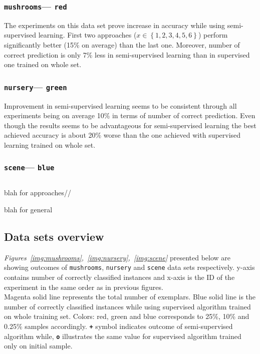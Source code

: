 \documentclass[12pt, a4paper, pdflatex]{report}
\begin{document}
\subsubsection{\texttt{mushrooms}--- \texttt{red}}
The experiments on this data set prove increase in accuracy while using semi-supervised learning. First two approaches ($x \in \left \{ 1, 2, 3 ,4, 5, 6 \right \}$) perform significantly better (15\% on average) than the last one. Moreover, number of correct prediction is only 7\% less in semi-supervised learning than in supervised one trained on whole set.

\subsubsection{\texttt{nursery}--- \texttt{green}}
Improvement in semi-supervised learning seems to be consistent through all experiments being on average 10\% in terms of number of correct prediction. Even though the results seems to be advantageous for semi-supervised learning the best achieved accuracy is about 20\% worse than the one achieved with supervised learning trained on whole set.

\subsubsection{\texttt{scene}--- \texttt{blue}}


\subsection*{}
blah for approaches//

blah for general



\subsection{Data sets overview}
\emph{Figures~\ref{img:mushrooms},~\ref{img:nursery},~\ref{img:scene}} presented below are showing outcomes of \texttt{mushrooms}, \texttt{nursery} and \texttt{scene} data sets respectively. y-axis contains number of correctly classified instances and x-axis is the ID of the experiment in the same order as in previous figures.\\
Magenta solid line represents the total number of exemplars. Blue solid line is the number of correctly classified instances while using supervised algorithm trained on whole training set. Colors: red, green and blue corresponds to 25\%, 10\% and 0.25\% samples accordingly. \texttt{\textbf{+}} symbol indicates outcome of semi-supervised algorithm while, \texttt{\textbf{o}} illustrates the same value for supervised algorithm trained only on initial sample.\\
\end{document}
